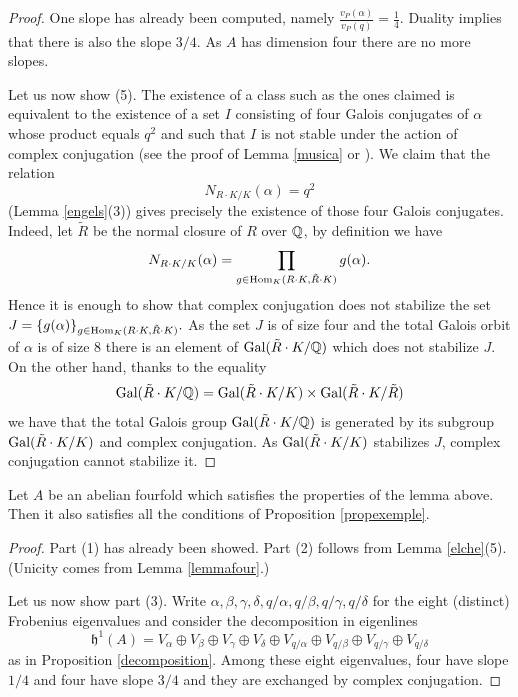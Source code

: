 \documentclass[11pt]{amsart}
\begin{document}
\begin{appendices}
\begin{proof}
One slope has already been computed, namely $\frac{v_P(\alpha)}{v_P(q)}=\frac{1}{4}.$ Duality implies that there is also the slope $3/4$. As $A$ has dimension four there are no more slopes.

Let us  now show (5). The existence of a class such as the ones claimed is equivalent to the existence of a set $I$ consisting of four Galois conjugates of $\alpha$  whose product equals $q^2$  and such that $I$ is not stable under the action of   complex conjugation (see the proof of  Lemma \ref{musica} or \cite[\S 2]{Zah}). We claim that the relation
\[N_{R\cdot K/K}(\alpha) = q^2 \]
(Lemma \ref{engels}(3))  gives precisely the existence of those four Galois conjugates. Indeed, let $\tilde{R}$ be the normal closure of $R$ over $\mathbb{Q}$, by definition we have
\[N_{R\cdot K/K}(\alpha) = \prod_{g \in \textnormal{Hom}_K( R\cdot K , \tilde{R}\cdot K)} g(\alpha).\]
Hence it is enough to show that  complex conjugation does not stabilize the set $J=\{g(\alpha)\}_{g \in \textnormal{Hom}_K( R\cdot K , \tilde{R}\cdot K)}.$ As the set   $J$ is of size four and the total Galois orbit of $\alpha$ is of size $8$ there is an element of $\textnormal{Gal}(\tilde{R}\cdot K/\mathbb{Q})$ which does not stabilize $J$.
On the other hand, thanks to the equality \[\textnormal{Gal}(\tilde{R}\cdot K/\mathbb{Q}) = \textnormal{Gal}(\tilde{R}\cdot K/K) \times \textnormal{Gal}(\tilde{R}\cdot K/\tilde{R})\]
we have that the total Galois group $\textnormal{Gal}(\tilde{R}\cdot K/\mathbb{Q})$ is generated by its subgroup $ \textnormal{Gal}(\tilde{R}\cdot K/K) $ and  complex conjugation. As  $ \textnormal{Gal}(\tilde{R}\cdot K/K) $ stabilizes $J$,   complex conjugation cannot stabilize it.
\end{proof}
\begin{lemma}\label{lemmafine}
Let $A$ be an abelian fourfold which satisfies the properties of the lemma above. Then it also satisfies all the conditions of Proposition \ref{propexemple}.
\end{lemma}
\begin{proof}
Part (1) has already been showed. Part (2) follows from Lemma \ref{elche}(5). (Unicity comes from Lemma \ref{lemmafour}.)

Let us now show part (3). Write $\alpha, \beta, \gamma, \delta, q/\alpha, q/\beta, q/\gamma, q/ \delta $ for the eight (distinct) Frobenius eigenvalues and consider the decomposition in eigenlines
\[\mathfrak{h}^1(A)=V_\alpha \oplus V_\beta \oplus V_\gamma \oplus V_\delta \oplus V_{q/\alpha} \oplus V_{q/\beta} \oplus V_{q/\gamma} \oplus V_{q/ \delta} \]
as in Proposition \ref{decomposition}. Among these eight eigenvalues, four have slope $1/4$ and four have slope $3/4$ and they are exchanged by complex conjugation.


\end{proof}
\end{appendices}
\end{document}
